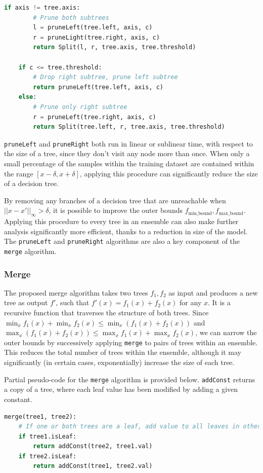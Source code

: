 \documentclass[pageno]{jpaper}
\newcommand{\fminb}{f_{\textrm{min\_bound}}}
\newcommand{\fmaxb}{f_{\textrm{max\_bound}}}
\begin{document}
\begin{doublespacing}
{\begin{lstlisting}[language=Python, caption=pruneLeft algorithm]
	if axis != tree.axis:
		# Prune both subtrees
		l = pruneLeft(tree.left, axis, c)
		r = pruneLight(tree.right, axis, c)
		return Split(l, r, tree.axis, tree.threshold)

	if c <= tree.threshold:
		# Drop right subtree, prune left subtree
		return pruneLeft(tree.left, axis, c)
	else:
		# Prune only right subtree
		r = pruneLeft(tree.right, axis, c)
		return Split(tree.left, r, tree.axis, tree.threshold)		
\end{lstlisting}
}

\verb|pruneLeft| and \verb|pruneRight| both run in linear or sublinear time, with respect to the size of a tree, since they don't visit any node more than once. When only a small percentage of the samples within the training dataset are contained within the range $[x - \delta, x + \delta]$, applying this procedure can significantly reduce the size of a decision tree. 

By removing any branches of a decision tree that are unreachable when $||x - x'||_\infty > \delta$, it is possible to improve the outer bounds $\fminb, \fmaxb$. Applying this procedure to every tree in an ensemble can also make further analysis significantly more efficient, thanks to a reduction in size of the model. The \verb|pruneLeft| and \verb|pruneRight| algorithms are also a key component of the \verb|merge| algorithm.

\subsubsection{Merge}
The proposed merge algorithm takes two trees $f_1, f_2$ as input and produces a new tree as output $f'$, such that $f'(x) = f_1(x) + f_2(x)$ for any $x$. It is a recursive function that traverses the structure of both trees. Since $\min_x f_1 (x) + \min_x f_2 (x) \le \min_x (f_1 (x) + f_2 ( x))$ and $\max_x (f_1 (x) + f_2(x)) \le \max_x f_1 (x) + \max_x f_2 (x)$, we can narrow the outer bounds by successively applying \verb|merge| to pairs of trees within an ensemble. This reduces the total number of trees within the ensemble, although it may significantly (in certain cases, exponentially) increase the size of each tree.

Partial pseudo-code for the \verb|merge| algorithm is provided below. \verb|addConst| returns a copy of a tree, where each leaf value has been modified by adding a given constant.

{\singlespacing
\begin{lstlisting}[language=Python, caption=merge algorithm]
merge(tree1, tree2):
	# If one or both trees are a leaf, add value to all leaves in other tree
	if tree1.isLeaf:
		return addConst(tree2, tree1.val)
	if tree2.isLeaf:
		return addConst(tree1, tree2.val)


\end{lstlisting}}
\end{doublespacing}
\end{document}
